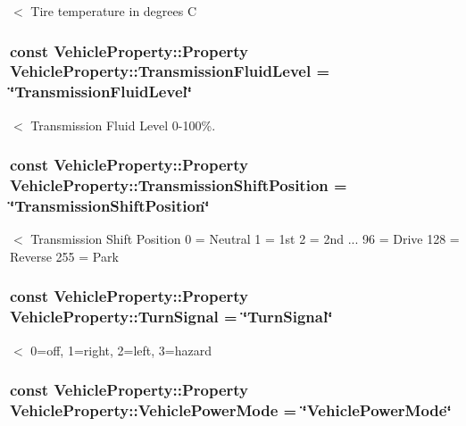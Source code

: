$<$ Tire temperature in degrees C \hypertarget{classVehicleProperty_a288aa5c2be698825142da9d87c13c447}{
\subsubsection[{Transmission\-Fluid\-Level}]{\setlength{\rightskip}{0pt plus 5cm}const Vehicle\-Property\-::\-Property Vehicle\-Property\-::\-Transmission\-Fluid\-Level = \char`\"{}Transmission\-Fluid\-Level\char`\"{}\hspace{0.3cm}{\ttfamily [static]}}}\label{classVehicleProperty_a288aa5c2be698825142da9d87c13c447}
$<$ Transmission Fluid Level 0-\/100\%. \hypertarget{classVehicleProperty_ae486d9ea26918460822086b797018800}{
\subsubsection[{Transmission\-Shift\-Position}]{\setlength{\rightskip}{0pt plus 5cm}const Vehicle\-Property\-::\-Property Vehicle\-Property\-::\-Transmission\-Shift\-Position = \char`\"{}Transmission\-Shift\-Position\char`\"{}\hspace{0.3cm}{\ttfamily [static]}}}\label{classVehicleProperty_ae486d9ea26918460822086b797018800}
$<$ Transmission Shift Position 0 = Neutral 1 = 1st 2 = 2nd ... 96 = Drive 128 = Reverse 255 = Park \hypertarget{classVehicleProperty_a0aae609c370a46a92dc52a31d2cc0310}{
\subsubsection[{Turn\-Signal}]{\setlength{\rightskip}{0pt plus 5cm}const Vehicle\-Property\-::\-Property Vehicle\-Property\-::\-Turn\-Signal = \char`\"{}Turn\-Signal\char`\"{}\hspace{0.3cm}{\ttfamily [static]}}}\label{classVehicleProperty_a0aae609c370a46a92dc52a31d2cc0310}
$<$ 0=off, 1=right, 2=left, 3=hazard \hypertarget{classVehicleProperty_a80cc1f343da6754346e4bcc0cc7ae009}{
\subsubsection[{Vehicle\-Power\-Mode}]{\setlength{\rightskip}{0pt plus 5cm}const Vehicle\-Property\-::\-Property Vehicle\-Property\-::\-Vehicle\-Power\-Mode = \char`\"{}Vehicle\-Power\-Mode\char`\"{}\hspace{0.3cm}{\ttfamily [static]}}}\label{classVehicleProperty_a80cc1f343da6754346e4bcc0cc7ae009}
